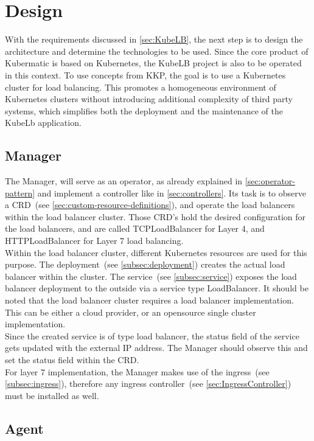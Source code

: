 \chapter{Design}

With the requirements discussed in \autoref{sec:KubeLB}, the next step is to design the architecture and determine the technologies to be used.
Since the core product of Kubermatic is based on Kubernetes, the KubeLB project is also to be operated in this context.
To use concepts from KKP, the goal is to use a Kubernetes cluster for load balancing.
This promotes a homogeneous environment of Kubernetes clusters without introducing additional complexity of third party systems, which simplifies both the deployment and the maintenance of the KubeLb application.

\section{Manager}\label{sec:manager}

The Manager, will serve as an operator, as already explained in \autoref{sec:operator-pattern} and implement a controller like in \autoref{sec:controllers}.
Its task is to observe a CRD~(see \autoref{sec:custom-resource-definitions}), and operate the load balancers within the load balancer cluster.
Those CRD's hold the desired configuration for the load balancers, and are called TCPLoadBalancer for Layer 4, and HTTPLoadBalancer for Layer 7 load balancing.
\\
Within the load balancer cluster, different Kubernetes resources are used for this purpose.
The deployment~(see \autoref{subsec:deployment}) creates the actual load balancer within the cluster.
The service~(see \autoref{subsec:service}) exposes the load balancer deployment to the outside via a service type LoadBalancer.
It should be noted that the load balancer cluster requires a load balancer implementation.
This can be either a cloud provider, or an opensource single cluster implementation.
\\
Since the created service is of type load balancer, the status field of the service gets updated with the external IP address.
The Manager should observe this and set the status field within the CRD.
\\
For layer 7 implementation, the Manager makes use of the ingress~(see \autoref{subsec:ingress}), therefore any ingress controller~(see \autoref{sec:IngressController}) must be installed as well.

\section{Agent}\label{sec:agent}

